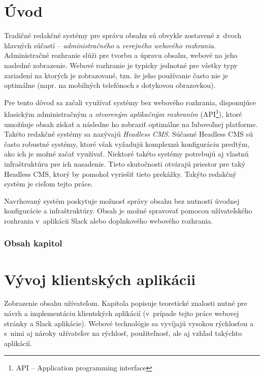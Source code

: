 \chapter{Úvod}
Tradičné redakčné systémy pre správu obsahu sú obvykle zostavené z~dvoch hlavných súčastí -- \emph{administračného} a \emph{verejného webového rozhrania}. Administračné rozhranie slúži pre tvorbu a úpravu obsahu, webové na jeho nasledné zobrazenie. Webové rozhranie je typicky jednotné pre všetky typy zariadení na ktorých je zobrazované, tzn. že jeho používanie často nie je optimálne (napr. na mobilných telefónoch s dotykovou obrazovkou).

Pre tento dôvod sa začali využívať systémy bez webového rozhrania, disponujúce klasickým administračným a \emph{otvoreným aplikačným rozhraním} (API\footnote{API -- Application programming interface}), ktoré umožňuje obsah získať a následne ho zobraziť optimálne na ľubovoľnej platforme. Takéto redakčné systémy sa nazývajú \emph{Headless CMS}. Súčasné Headless CMS sú často robustné systémy, ktoré však vyžadujú komplexnú konfiguráciu predtým, ako ich je možné začať využívať. Niektoré takéto systémy potrebujú aj vlastnú infraštruktúru pre ich nasadenie. Tieto skutočnosti otvárajú priestor pre taký Headless CMS, ktorý by pomohol vyriešiť tieto prekážky. Takýto redakčný systém je cieľom tejto práce.

Navrhovaný systém poskytuje možnosť správy obsahu bez nutnosti úvodnej konfigurácie a infraštruktúry. Obsah je možné spravovať pomocou užívateľského rozhrania v~aplikácii Slack alebo doplnkového webového rozhrania.

\subsection*{Obsah kapitol}

\chapter{Vývoj klientských aplikácii}
\label{theory:client_dev}
Zobrazenie obsahu užívateľom. Kapitola popisuje teoretické znalosti nutné pre návrh a implementáciu klientských aplikácií (v~prípade tejto práce webovej stránky a Slack aplikácie). Webové technológie sa vyvíjajú vysokou rýchlosťou a s~nimi aj nároky užívateľov na rýchlosť, použiteľnosť, ale aj vzhľad takýchto aplikácií.

